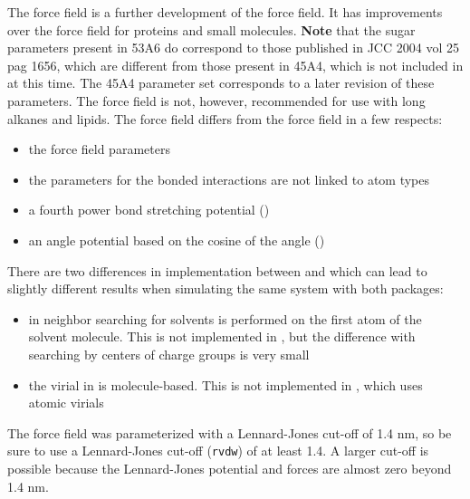 The  force field is a further development of the  force field.
It has improvements over the  force field for proteins and small molecules.
{\bf Note} that the sugar parameters present in 53A6 do correspond to those published in 
JCC 2004 vol 25 pag 1656, which are different from those present in 45A4, which
is not included in {\gromacs} at this time.  The 45A4 parameter set corresponds to a later
revision of these parameters. 
The  force field is not, however, recommended for use with long alkanes and
lipids.  The  force field differs from the 
force field in a few respects:
\begin{itemize}
\item the force field parameters
\item the parameters for the bonded interactions are not linked to atom types
\item a fourth power bond stretching potential ()
\item an angle potential based on the cosine of the angle ()
\end{itemize}
There are two differences in implementation between {\gromacs} and 
which can lead to slightly different results when simulating the same system
with both packages: 
\begin{itemize}
\item in  neighbor searching for solvents is performed on the
first atom of the solvent molecule.  This is not implemented in {\gromacs},
but the difference with searching by centers of charge groups is very small
\item the virial in  is molecule-based. This is not implemented in
{\gromacs}, which uses atomic virials
\end{itemize}
The  force field was parameterized with a Lennard-Jones cut-off
of 1.4 nm, so be sure to use a Lennard-Jones cut-off ({\tt rvdw}) of at least 1.4.
A larger cut-off is possible because the Lennard-Jones potential and forces
are almost zero beyond 1.4 nm.

